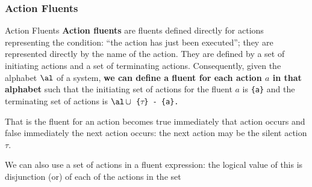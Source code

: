 \subsubsection{Action Fluents}\label{sub:an_action_fluents} %
\begin{definition}{Action Fluents}{}
    \textbf{Action fluents} are fluents defined directly for actions representing the condition: ``the action has just been executed''; they are represented directly by the name of the action.
    \emptyln{}
    They are defined by a set of initiating actions and a set of terminating actions.
    Consequently, given the alphabet $\al$ of a system, \textbf{we can define a fluent for each action $a$ in that alphabet} such that the initiating set of actions for the fluent $a$ is \texttt{\{a\}} and the terminating set of actions is \texttt{$\al\,\cup$ \{$\tau$\} - \{a\}.}
    \begin{note}
        That is the fluent for an action becomes true immediately that action occurs and false immediately the next action occurs: the next action may be the silent action $\tau$.
    \end{note}
\end{definition}
\begin{warning}
    We can also use a set of actions in a fluent expression: the logical value of this is disjunction (or) of each of the actions in the set
\end{warning}
%
